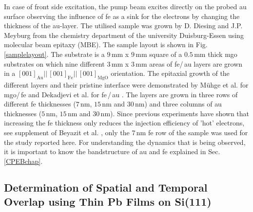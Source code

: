 \documentclass[a4paper,12pt,twoside]{article}
\begin{document}
In case of front side excitation, the pump beam excites directly on the probed \gls{au} surface observing the influence of \gls{fe} as a sink for the electrons by changing the thickness of the \gls{au}-layer. The utilised sample was grown by D. Diesing and J.P. Meyburg from the chemistry department of the university Duisburg-Essen using molecular beam epitaxy (MBE). The sample layout is shown in Fig.\,\ref{samplelayout}. The substrate is a $9\,\mathrm{mm}$ x $9\,\mathrm{mm}$ square of a $0.5\,\mathrm{mm}$ thick \gls{mgo} substrates on which nine different $3\,\mathrm{mm}$ x $3\,\mathrm{mm}$ areas of \gls{fe}/\,\gls{au} layers are grown in a $[001]_{\mathrm{Au}} ||\, [001]_{\mathrm{Fe}} ||\, [001]_{\mathrm{MgO}}$ orientation. The epitaxial growth of the different layers and their pristine interface were demonstrated by Mühge et al. for \gls{mgo}/\,\gls{fe} \cite{Mhge1994} and Dekadjevi et al. for \gls{fe}\,/\,\gls{au} \cite{PhysRevLett.86.5787}. The layers are grown in three rows of different \gls{fe} thicknesses ($7\,\mathrm{nm}$, $15\,\mathrm{nm}$ and $30\,\mathrm{nm}$) and three columns of \gls{au} thicknesses ($5\,\mathrm{nm}$, $15\,\mathrm{nm}$ and $30\,\mathrm{nm}$). Since previous experiments have shown that increasing the \gls{fe} thickness only reduces the injection efficiency of 'hot' electrons, see supplement of Beyazit et al. \cite{beyazit2019}, only the $7\,\mathrm{nm}$ \gls{fe} row of the sample was used for the study reported here. For understanding the dynamics that is being observed, it is important to know the bandstructure of \gls{au} and \gls{fe} explained in Sec.\,\ref{CPEBchap}.


\subsection{Determination of Spatial and Temporal Overlap using Thin Pb Films on Si(111)}
\end{document}
